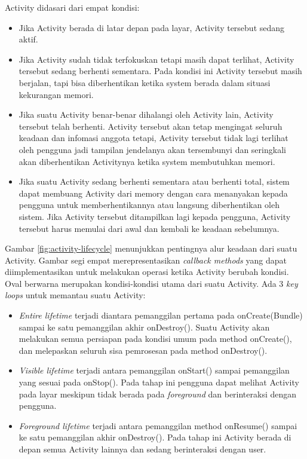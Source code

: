 \documentclass[a4paper,twoside]{article}
\begin{document}
\begin{enumerate}
Activity didasari dari empat kondisi:
\begin{itemize}
	\item Jika Activity berada di latar depan pada layar, Activity tersebut sedang aktif.
	\item Jika Activity sudah tidak terfokuskan tetapi masih dapat terlihat, Activity tersebut sedang berhenti sementara. Pada kondisi ini Activity tersebut masih berjalan, tapi bisa diberhentikan ketika system berada dalam situasi kekurangan memori.
	\item Jika suatu Activity benar-benar dihalangi oleh Activity lain, Activity tersebut telah berhenti. Activity tersebut akan tetap mengingat seluruh keadaan dan infomasi anggota tetapi, Activity tersebut tidak lagi terlihat oleh pengguna jadi tampilan jendelanya akan tersembunyi dan seringkali akan diberhentikan Activitynya ketika system membutuhkan memori.
	\item Jika suatu Activity sedang berhenti sementara atau berhenti total, sistem dapat membuang Activity dari memory dengan cara menanyakan kepada pengguna untuk memberhentikannya atau langsung diberhentikan oleh sistem. Jika Activity tersebut ditampilkan lagi kepada pengguna, Activity tersebut harus memulai dari awal dan kembali ke keadaan sebelumnya.
\end{itemize}
Gambar \ref{fig:activity-lifecycle} menunjukkan pentingnya alur keadaan dari suatu Activity. Gambar segi empat merepresentasikan \textit{callback methods} yang dapat diimplementasikan untuk melakukan operasi ketika Activity berubah kondisi. Oval berwarna merupakan kondisi-kondisi utama dari suatu Activity.
Ada 3 \textit{key loops} untuk memantau suatu Activity:
\begin{itemize}
	\item \textit{Entire lifetime} terjadi diantara pemanggilan pertama pada onCreate(Bundle) sampai ke satu pemanggilan akhir onDestroy(). Suatu Activity akan melakukan semua persiapan pada kondisi umum pada method onCreate(), dan melepaskan seluruh sisa pemrosesan pada method onDestroy().
	\item \textit{Visible lifetime} terjadi antara pemanggilan onStart() sampai pemanggilan yang sesuai pada onStop(). Pada tahap ini pengguna dapat melihat Activity pada layar meskipun tidak berada pada \textit{foreground} dan berinteraksi dengan pengguna.
	\item \textit{Foreground lifetime} terjadi antara pemanggilan method onResume() sampai ke satu pemanggilan akhir onDestroy(). Pada tahap ini Activity berada di depan semua Activity lainnya dan sedang berinteraksi dengan user.
\end{itemize}



\end{enumerate}
\end{document}

